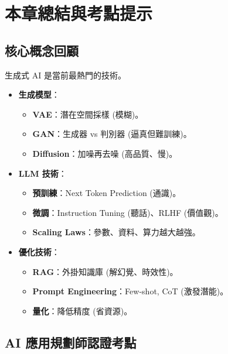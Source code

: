\documentclass[
  letterpaper,
  DIV=11,
  numbers=noendperiod]{scrreprt}
\providecommand{\tightlist}{%
  \setlength{\itemsep}{0pt}\setlength{\parskip}{0pt}}
\begin{document}
\chapter{本章總結與考點提示}\label{chap-chapter8-summary}

\section{核心概念回顧}\label{ux6838ux5fc3ux6982ux5ff5ux56deux9867-7}

生成式 AI 是當前最熱門的技術。

\begin{itemize}
\tightlist
\item
  \textbf{生成模型}：

  \begin{itemize}
  \tightlist
  \item
    \textbf{VAE}：潛在空間採樣 (模糊)。
  \item
    \textbf{GAN}：生成器 vs 判別器 (逼真但難訓練)。
  \item
    \textbf{Diffusion}：加噪再去噪 (高品質、慢)。
  \end{itemize}
\item
  \textbf{LLM 技術}：

  \begin{itemize}
  \tightlist
  \item
    \textbf{預訓練}：Next Token Prediction (通識)。
  \item
    \textbf{微調}：Instruction Tuning (聽話)、RLHF (價值觀)。
  \item
    \textbf{Scaling Laws}：參數、資料、算力越大越強。
  \end{itemize}
\item
  \textbf{優化技術}：

  \begin{itemize}
  \tightlist
  \item
    \textbf{RAG}：外掛知識庫 (解幻覺、時效性)。
  \item
    \textbf{Prompt Engineering}：Few-shot, CoT (激發潛能)。
  \item
    \textbf{量化}：降低精度 (省資源)。
  \end{itemize}
\end{itemize}

\section{AI
應用規劃師認證考點}\label{ai-ux61c9ux7528ux898fux5283ux5e2bux8a8dux8b49ux8003ux9ede-7}
\end{document}
